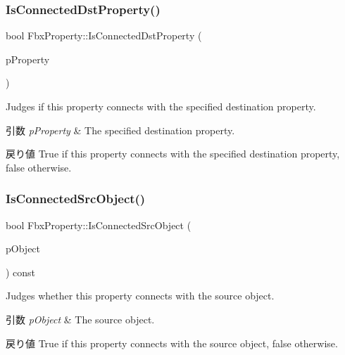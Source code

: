 \subsubsection{\texorpdfstring{Is\+Connected\+Dst\+Property()}{IsConnectedDstProperty()}}
{\footnotesize\ttfamily bool Fbx\+Property\+::\+Is\+Connected\+Dst\+Property (\begin{DoxyParamCaption}\item[{const \hyperlink{class_fbx_property}{Fbx\+Property} \&}]{p\+Property }\end{DoxyParamCaption})}

Judges if this property connects with the specified destination property. 
\begin{DoxyParams}{引数}
{\em p\+Property} & The specified destination property. \\
\hline
\end{DoxyParams}
\begin{DoxyReturn}{戻り値}
{\ttfamily True} if this property connects with the specified destination property, {\ttfamily false} otherwise. 
\end{DoxyReturn}
\mbox{\label{class_fbx_property_af4fc85f2c880d813903e158147aeeae4}} 
\subsubsection{\texorpdfstring{Is\+Connected\+Src\+Object()}{IsConnectedSrcObject()}}
{\footnotesize\ttfamily bool Fbx\+Property\+::\+Is\+Connected\+Src\+Object (\begin{DoxyParamCaption}\item[{const \hyperlink{class_fbx_object}{Fbx\+Object} $\ast$}]{p\+Object }\end{DoxyParamCaption}) const}

Judges whether this property connects with the source object. 
\begin{DoxyParams}{引数}
{\em p\+Object} & The source object. \\
\hline
\end{DoxyParams}
\begin{DoxyReturn}{戻り値}
{\ttfamily True} if this property connects with the source object, {\ttfamily false} otherwise. 
\end{DoxyReturn}
\mbox{\label{class_fbx_property_aca4ace4ad256046bc548c54173dab0c1}} 
